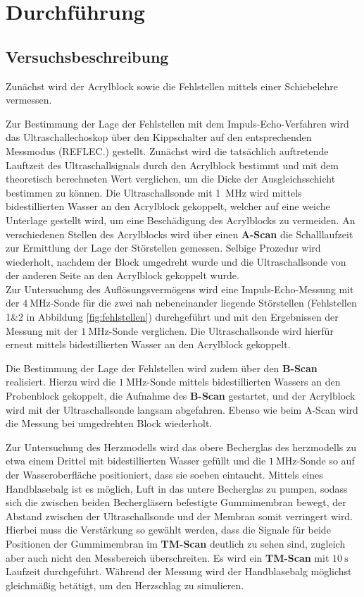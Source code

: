 \section{Durchführung}
\label{sec:Durchführung}



\subsection{Versuchsbeschreibung}
\label{sec:Versuchsbeschreibung}
Zunächst wird der Acrylblock sowie die Fehlstellen mittels einer Schiebelehre vermessen.

Zur Bestimmung der Lage der Fehlstellen mit dem Impuls-Echo-Verfahren wird das Ultraschallechoskop über den Kippschalter auf den entsprechenden Messmodus (REFLEC.) gestellt.
Zunächst wird die tatsächlich auftretende Lauftzeit des Ultraschallsignals durch den Acrylblock bestimmt und mit dem theoretisch berechneten Wert verglichen, um die Dicke der Ausgleichsschicht bestimmen zu können.
Die Ultraschallsonde mit \SI{1}{\mega\Hz} wird mittels bidestillierten Wasser an den Acrylblock gekoppelt, welcher auf eine weiche Unterlage gestellt wird, um eine Beschädigung des Acrylblocks zu vermeiden.
An verschiedenen Stellen des Acrylblocks wird über einen \textbf{A-Scan} die Schalllaufzeit zur Ermittlung der Lage der Störstellen gemessen. Selbige Prozedur wird wiederholt, nachdem der Block umgedreht wurde und die Ultraschallsonde von der anderen Seite an den Acrylblock gekoppelt wurde.
\\Zur Untersuchung des Auflösungsvermögens wird eine Impuls-Echo-Messung mit der $\SI{4}{\mega\Hz}$-Sonde für die zwei nah nebeneinander liegende Störstellen (Fehlstellen 1\&2 in Abbildung \ref{fig:fehlstellen}) durchgeführt und mit den Ergebnissen der Messung mit der $\SI{1}{\mega\Hz}$-Sonde verglichen.
Die Ultraschallsonde wird hierfür erneut mittels bidestillierten Wasser an den Acrylblock gekoppelt.

Die Bestimmung der Lage der Fehlstellen wird zudem über den \textbf{B-Scan} realisiert. Hierzu wird die $\SI{1}{\mega\Hz}$-Sonde mittels bidestillierten Wassers an den Probenblock gekoppelt, die Aufnahme des \textbf{B-Scan} gestartet, und der Acrylblock wird mit der Ultraschallsonde langsam abgefahren.
Ebenso wie beim A-Scan wird die Messung bei umgedrehten Block wiederholt.

Zur Untersuchung des Herzmodells wird das obere Becherglas des herzmodells zu etwa einem Drittel mit bidestillierten Wasser gefüllt und die $\SI{1}{\mega\Hz}$-Sonde so auf der Wasseroberfläche positioniert, dass sie soeben eintaucht. Mittels eines Handblasebalg ist es möglich, Luft in das untere Becherglas zu pumpen, sodass sich die zwischen beiden Bechergläsern befestigte Gummimembran bewegt, der Abstand zwischen der Ultraschallsonde und der Membran somit verringert wird. Hierbei muss die Verstärkung so gewählt werden, dass die Signale  für beide Positionen der Gummimembran im \textbf{TM-Scan} deutlich zu sehen sind, zugleich aber auch nicht den Messbereich überschreiten.
Es wird ein \textbf{TM-Scan} mit $\SI{10}{\second}$ Laufzeit durchgeführt. Während der Messung wird der Handblasebalg möglichst gleichmäßig betätigt, um den Herzschlag zu simulieren.
